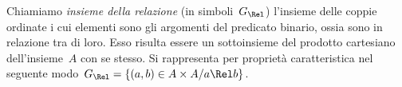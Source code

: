 \begin{definizione}
Chiamiamo \emph{insieme della relazione} (in simboli~\(G_\Rel\)) l'insieme delle 
coppie ordinate i cui
elementi sono gli argomenti del predicato binario, ossia sono in relazione tra 
di loro. Esso risulta essere un
sottoinsieme del prodotto cartesiano dell'insieme~\(A\) con se stesso. Si 
rappresenta per proprietà caratteristica nel
seguente modo~\(G_\Rel = \lbrace (a,b) \in A \times A / a \Rel b \rbrace\).
\end{definizione}


\begin{comment}
 
\subsection{Rappresentazioni di una relazione}
\label{subsec:rel_rappresentazione}

\subsubsection{Grafico di una relazione}

Dal momento che una relazione in un insieme~\(Y\) determina un sottoinsieme del 
prodotto cartesiano~\(Y \times Y\) è
comodo rappresentare una relazione nello stesso diagramma usato per 
rappresentare il prodotto cartesiano.
Una relazione può quindi essere rappresentata attraverso un \emph{grafico 
cartesiano}.


\subsubsection{Matrice o tabella di una relazione}

Nella figura~\ref{fig:B.1} è rappresentata la classica griglia per il gioco 
della battaglia navale.
Ogni cella è individuata da una coppia ordinata il cui primo elemento (una 
lettera dell'alfabeto) indica la riga,
il secondo (un numero) indica la colonna; così la coppia~\((D,5)\) indica la cella 
annerita.



\subsubsection{Grafo di una relazione}


\end{comment}
